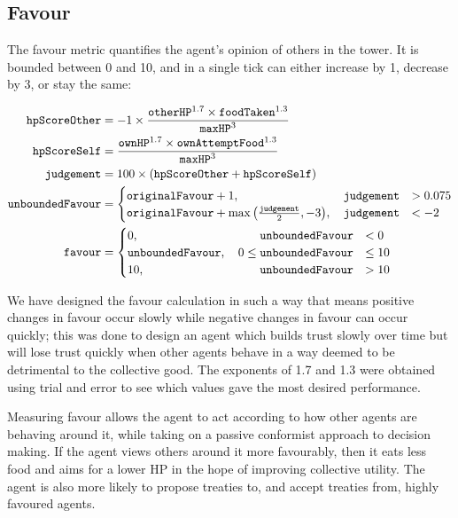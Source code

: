 \subsection*{Favour}\label{sec:team5-favour}
The favour metric quantifies the agent's opinion of others in the tower. It is bounded between 0 and 10, and in a single tick can either increase by 1, decrease by 3, or stay the same:

\begin{align*}
    \texttt{hpScoreOther} &= -1 \times \frac{\texttt{otherHP}^{1.7} \times \texttt{foodTaken}^{1.3}}{\texttt{maxHP}^3}\\
    \texttt{hpScoreSelf} &= \frac{\texttt{ownHP}^{1.7}\times\texttt{ownAttemptFood}^{1.3}}{\texttt{maxHP}^3}\\
    \texttt{judgement} &= 100 \times (\texttt{hpScoreOther} + \texttt{hpScoreSelf})\\
    \texttt{unboundedFavour} &= \begin{cases}
        \texttt{originalFavour} + 1, \quad\hfill \texttt{judgement} &> 0.075\\
        \texttt{originalFavour} + \max{\left(\frac{\texttt{judgement}}{2}, -3\right)}, \quad\hfill\texttt{judgement} &< -2
    \end{cases}\\
    \texttt{favour} &= \begin{cases}
        0, \quad\hfill \texttt{unboundedFavour} &< 0\\
        \texttt{unboundedFavour}, \quad 0 \leq \texttt{unboundedFavour} &\leq 10\\
        10, \quad\hfill \texttt{unboundedFavour} &> 10
    \end{cases}\\
\end{align*}

We have designed the favour calculation in such a way that means positive changes in favour occur slowly while negative changes in favour can occur quickly; this was done to design an agent which builds trust slowly over time but will lose trust quickly when other agents behave in a way deemed to be detrimental to the collective good. The exponents of 1.7 and 1.3 were obtained using trial and error to see which values gave the most desired performance.

Measuring favour allows the agent to act according to how other agents are behaving around it, while taking on a passive conformist approach to decision making. If the agent views others around it more favourably, then it eats less food and aims for a lower HP in the hope of improving collective utility. The agent is also more likely to propose treaties to, and accept treaties from, highly favoured agents.

